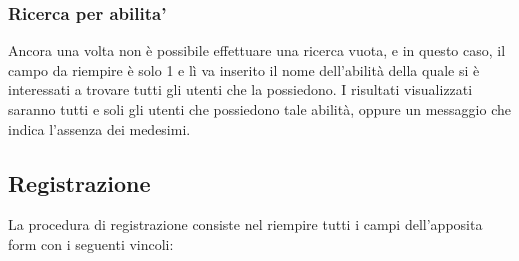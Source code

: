 \documentclass[a4paper,12pt]{article}
\begin{document}
\subsubsection{Ricerca per abilita'}
Ancora una volta non è possibile effettuare una ricerca vuota, e in questo caso, il campo da riempire è solo 1 e lì va inserito il nome dell'abilità della quale si è interessati a
trovare tutti gli utenti che la possiedono. I risultati visualizzati saranno tutti e soli gli utenti che possiedono tale abilità, oppure un messaggio che indica l'assenza dei medesimi.

\subsection{Registrazione}
La procedura di registrazione consiste nel riempire tutti i campi dell'apposita form con i seguenti vincoli:
\end{document}
